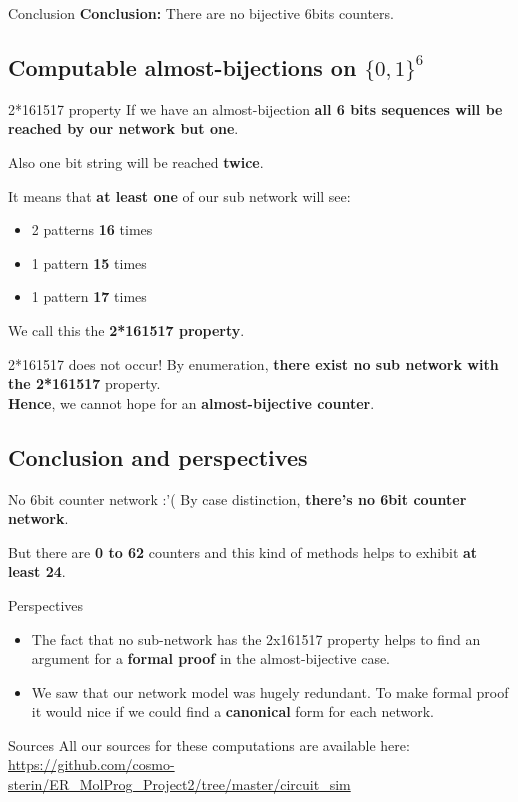 \documentclass{beamer}
\begin{document}
\begin{frame}{Conclusion}
	\textbf{Conclusion:} There are no bijective 6bits counters.
\end{frame}


\subsection{Computable almost-bijections on $\{0,1\}^6$}

\begin{frame}{2*161517 property}
	If we have an almost-bijection \textbf{all 6 bits sequences will be reached by our network but one}.\medskip\pause
	
	Also one bit string will be reached \textbf{twice}. \medskip\pause
	
	It means that \textbf{at least one} of our sub network will see:
	\begin{itemize}
		\item 2 patterns \textbf{16} times
		\item 1 pattern \textbf{15} times
		\item 1 pattern \textbf{17} times
	\end{itemize}\pause\bigskip

	We call this the \textbf{2*161517 property}.
\end{frame}

\begin{frame}{2*161517 does not occur!}
	By enumeration, \textbf{there exist no sub network with the 2*161517} property. \\
	\textbf{Hence}, we cannot hope for an \textbf{almost-bijective counter}.
\end{frame}

\subsection{Conclusion and perspectives}

\begin{frame}{No 6bit counter network :'( }
	By case distinction, \textbf{there's no 6bit counter network}.
	\medskip\pause
	
	But there are \textbf{0 to 62} counters and this kind of methods helps to exhibit \textbf{at least 24}.
\end{frame}

\begin{frame}{Perspectives}
	\begin{itemize}

		\item The fact that no sub-network has the 2x161517 property helps to find an argument for a \textbf{formal proof} in the almost-bijective case.
		\item We saw that our network model was hugely redundant. To make formal proof it would nice if we could find a \textbf{canonical} form for each network. 
	\end{itemize}
\end{frame}

\begin{frame}{Sources}
	All our sources for these computations are available here:
	\url{https://github.com/cosmo-sterin/ER_MolProg_Project2/tree/master/circuit_sim}
\end{frame}
\end{document}
